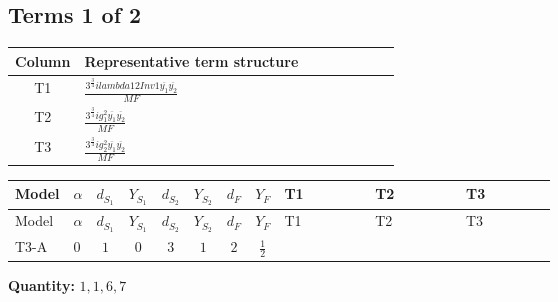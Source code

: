 \documentclass[8pt]{article}
\begin{document}
\begin{landscape}
\subsection*{Terms 1 of 2}
\begin{center}
\begin{tabular}{@{}c >{\raggedright\arraybackslash}p{0.82\linewidth}@{}}
\toprule
Column & Representative term structure \\
\midrule
T1 & \(\displaystyle \frac{3^{\frac{3}{4}} i lambda12Inv1 \overline{y_{1}} \overline{y_{2}}}{MF}\) \\
\midrule
T2 & \(\displaystyle \frac{3^{\frac{3}{4}} i g_{1}^{2} \overline{y_{1}} \overline{y_{2}}}{MF}\) \\
\midrule
T3 & \(\displaystyle \frac{3^{\frac{3}{4}} i g_{2}^{2} \overline{y_{1}} \overline{y_{2}}}{MF}\) \\
\midrule
\bottomrule
\end{tabular}
\end{center}
\smallskip
\tiny
\begin{longtable}{@{}llcccccc >{\raggedright\arraybackslash}p{0.21\linewidth} >{\raggedright\arraybackslash}p{0.21\linewidth} >{\raggedright\arraybackslash}p{0.21\linewidth}@{}}
\toprule
Model & $\alpha$ & $d_{S_1}$ & $Y_{S_1}$ & $d_{S_2}$ & $Y_{S_2}$ & $d_F$ & $Y_F$ & T1 & T2 & T3 \\
\midrule
\endfirsthead
\toprule
Model & $\alpha$ & $d_{S_1}$ & $Y_{S_1}$ & $d_{S_2}$ & $Y_{S_2}$ & $d_F$ & $Y_F$ & T1 & T2 & T3 \\
\midrule
\endhead
T3-A & $0$ & $1$ & $0$ & $3$ & $1$ & $2$ & $\frac{1}{2}$ & \scriptsize\adjustbox{max width=\linewidth}{$\begin{gathered} \frac{3^{\frac{3}{4}} i lambda12Inv1 \overline{y_{1}} \overline{y_{2}}}{6 MF}\end{gathered}$} & \scriptsize\adjustbox{max width=\linewidth}{$\begin{gathered} \frac{3^{\frac{3}{4}} i g_{1}^{2} \overline{y_{1}} \overline{y_{2}}}{8 MF}\end{gathered}$} & \scriptsize\adjustbox{max width=\linewidth}{$\begin{gathered} \frac{11 \cdot 3^{\frac{3}{4}} i g_{2}^{2} \overline{y_{1}} \overline{y_{2}}}{8 MF}\end{gathered}$} \\
\midrule
\bottomrule
\end{longtable}
\clearpage
\noindent\textbf{Quantity: }$\mathrm{1,1,6,7}$\par\smallskip

\end{landscape}
\end{document}
